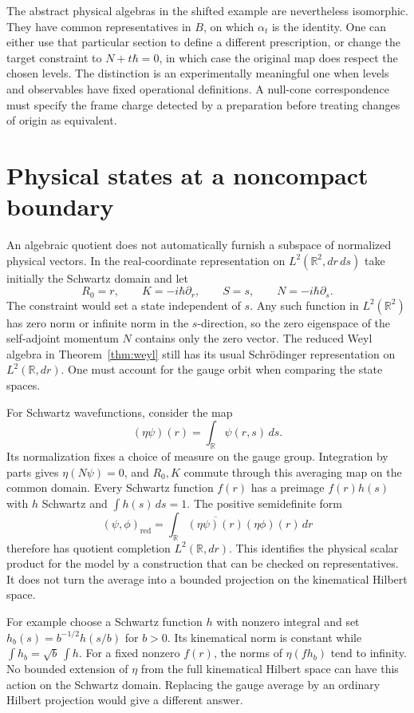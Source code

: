 \documentclass[11pt,letterpaper]{article}
\newcommand{\RR}{\mathbb R}
\begin{document}
The abstract physical algebras in the shifted example are nevertheless isomorphic. They have
common representatives in $B$, on which $\alpha_t$ is the identity. One can either use that
particular section to define a different prescription, or change the target constraint to
$N+t\hbar=0$, in which case the original map does respect the chosen levels. The distinction
is an experimentally meaningful one when levels and observables have fixed operational
definitions. A null-cone correspondence must specify the frame charge detected by a
preparation before treating changes of origin as equivalent.

\section{Physical states at a noncompact boundary}
An algebraic quotient does not automatically furnish a subspace of normalized physical
vectors. In the real-coordinate representation on $L^2(\RR^2,dr\,ds)$ take initially the
Schwartz domain and let
\[
 R_0=r,\qquad K=-i\hbar\partial_r,\qquad S=s,\qquad N=-i\hbar\partial_s .
\]
The constraint would set a state independent of $s$. Any such function in $L^2(\RR^2)$ has
zero norm or infinite norm in the $s$-direction, so the zero eigenspace of the self-adjoint
momentum $N$ contains only the zero vector. The reduced Weyl algebra in Theorem~\ref{thm:weyl}
still has its usual Schr\"odinger representation on $L^2(\RR,dr)$. One must account for the
gauge orbit when comparing the state spaces.

For Schwartz wavefunctions, consider the map
\[
 (\eta\psi)(r)=\int_{\RR}\psi(r,s)\,ds .
\]
Its normalization fixes a choice of measure on the gauge group. Integration by parts gives
$\eta(N\psi)=0$, and $R_0,K$ commute through this averaging map on the common domain. Every
Schwartz function $f(r)$ has a preimage $f(r)h(s)$ with $h$ Schwartz and $\int h(s)\,ds=1$.
The positive semidefinite form
\[
 (\psi,\phi)_{\mathrm{red}}
   =\int_{\RR}\overline{(\eta\psi)(r)}(\eta\phi)(r)\,dr
\]
therefore has quotient completion $L^2(\RR,dr)$. This identifies the physical scalar product
for the model by a construction that can be checked on representatives. It does not turn the
average into a bounded projection on the kinematical Hilbert space.

For example choose a Schwartz function $h$ with nonzero integral and set
$h_b(s)=b^{-1/2}h(s/b)$ for $b>0$. Its kinematical norm is constant while $\int h_b=\sqrt
b\,\int h$. For a fixed nonzero $f(r)$, the norms of $\eta(fh_b)$ tend to infinity. No bounded
extension of $\eta$ from the full kinematical Hilbert space can have this action on the
Schwartz domain. Replacing the gauge average by an ordinary Hilbert projection would give a
different answer.
\end{document}
